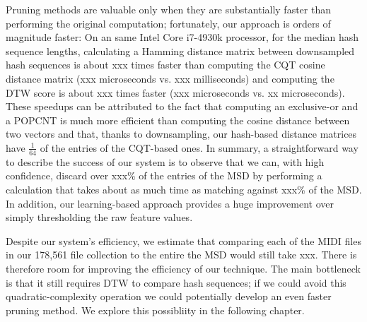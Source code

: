 Pruning methods are valuable only when they are substantially faster than performing the original computation; fortunately, our approach is orders of magnitude faster:
On an same Intel Core i7-4930k processor, for the median hash sequence lengths, calculating a Hamming distance matrix between downsampled hash sequences is about xxx times faster than computing the CQT cosine distance matrix (xxx microseconds vs. xxx milliseconds) and computing the DTW score is about xxx times faster (xxx microseconds vs. xx microseconds).
These speedups can be attributed to the fact that computing an exclusive-or and a POPCNT is much more efficient than computing the cosine distance between two vectors and that, thanks to downsampling, our hash-based distance matrices have $\frac{1}{64}$ of the entries of the CQT-based ones.
In summary, a straightforward way to describe the success of our system is to observe that we can, with high confidence, discard over xxx\% of the entries of the MSD by performing a calculation that takes about as much time as matching against xxx\% of the MSD.
In addition, our learning-based approach provides a huge improvement over simply thresholding the raw feature values.

Despite our system's efficiency, we estimate that comparing each of the MIDI files in our 178,561 file collection to the entire the MSD would still take xxx.
There is therefore room for improving the efficiency of our technique.
The main bottleneck is that it still requires DTW to compare hash sequences; if we could avoid this quadratic-complexity operation we could potentially develop an even faster pruning method.
We explore this possibliity in the following chapter.
